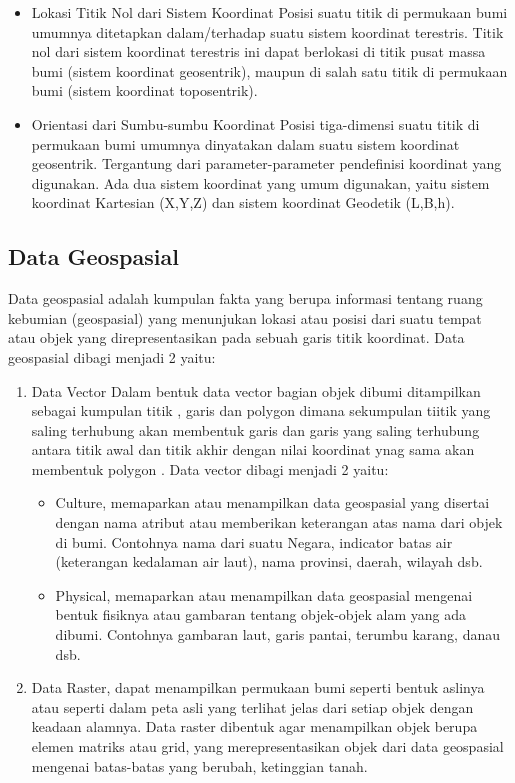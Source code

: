 \begin{itemize}
	\item Lokasi Titik Nol dari Sistem Koordinat
Posisi suatu titik di permukaan bumi umumnya ditetapkan dalam/terhadap suatu sistem koordinat terestris. Titik nol dari sistem koordinat terestris ini dapat berlokasi di titik pusat massa bumi (sistem koordinat geosentrik), maupun di salah satu titik di permukaan bumi (sistem koordinat toposentrik).  
	\item Orientasi dari Sumbu-sumbu Koordinat
Posisi tiga-dimensi suatu titik di permukaan bumi umumnya dinyatakan dalam suatu sistem koordinat geosentrik. Tergantung dari parameter-parameter pendefinisi koordinat yang digunakan. Ada dua sistem koordinat yang umum digunakan, yaitu sistem koordinat Kartesian (X,Y,Z) dan sistem koordinat Geodetik (L,B,h).
\end{itemize}


\subsection{Data Geospasial}
Data geospasial adalah kumpulan fakta yang berupa informasi tentang ruang kebumian (geospasial) yang menunjukan lokasi atau posisi dari suatu tempat atau objek yang direpresentasikan pada sebuah garis titik koordinat. Data geospasial dibagi menjadi 2 yaitu:

\begin{enumerate}
	\item Data Vector
Dalam bentuk data vector bagian objek dibumi ditampilkan sebagai kumpulan titik , garis dan polygon dimana sekumpulan tiitik yang saling terhubung akan membentuk garis dan garis yang saling terhubung antara titik awal dan titik akhir dengan nilai koordinat ynag sama akan membentuk polygon . Data vector dibagi menjadi 2 yaitu:

	\begin{itemize}
		\item Culture, memaparkan atau menampilkan data geospasial yang disertai dengan nama atribut atau memberikan keterangan atas nama dari objek di bumi. Contohnya nama dari suatu Negara, indicator batas air (keterangan kedalaman air laut), nama provinsi, daerah, wilayah dsb.
		\item Physical, memaparkan atau menampilkan data geospasial mengenai bentuk fisiknya atau gambaran tentang objek-objek alam yang ada dibumi. Contohnya gambaran laut, garis pantai, terumbu karang, danau dsb.
	\end{itemize}

	\item Data Raster, dapat menampilkan permukaan bumi seperti bentuk aslinya atau seperti dalam peta asli yang terlihat jelas dari setiap objek dengan keadaan alamnya. Data raster dibentuk agar menampilkan objek berupa elemen matriks atau grid, yang merepresentasikan objek dari data geospasial mengenai batas-batas yang berubah, ketinggian tanah.
\end{enumerate}

